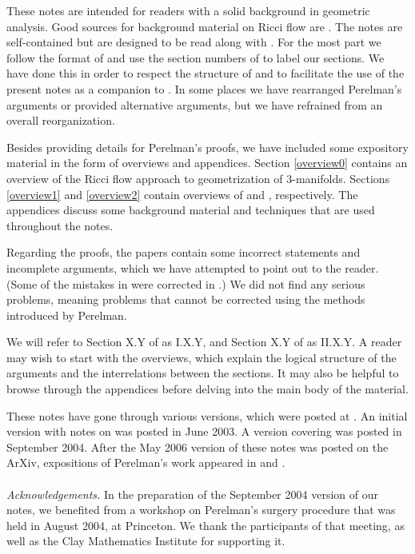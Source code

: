 \documentclass[12pt]{amsart}
\numberwithin{equation}{section}
\theoremstyle{plain}
\theoremstyle{definition}
\theoremstyle{remark}
\begin{document}
These notes are intended for readers with a solid background in geometric analysis.
Good sources for background material on Ricci flow are 
\cite{Chow-Knopf,Chow-Lu-Ni,Hamilton,Topping}.
The notes are self-contained but are designed to be read along with
\cite{Perelman,Perelman2}.
For the most part we follow the format of 
\cite{Perelman,Perelman2} and use the section numbers
of \cite{Perelman,Perelman2} to label our
sections. We have done this in order to respect the
structure of \cite{Perelman,Perelman2} and to facilitate the use of
the present notes as a companion to \cite{Perelman,Perelman2}.
 In some places we have rearranged Perelman's arguments
or provided alternative arguments,
but we have refrained from an overall reorganization.  

Besides providing details for Perelman's proofs, we have included some 
expository material in the form of overviews and appendices.
Section \ref{overview0} contains an overview of the Ricci flow approach to
geometrization of $3$-manifolds. Sections \ref{overview1} and \ref{overview2} contain
overviews of \cite{Perelman} and \cite{Perelman2}, respectively.
The appendices discuss some background material and
techniques that are used throughout the notes.

Regarding the proofs, the papers \cite{Perelman,Perelman2}  contain some incorrect statements 
and incomplete arguments, which we have attempted to point out to the reader.
(Some of the mistakes in \cite{Perelman} were corrected in \cite{Perelman2}.)
We did not find any
serious problems, meaning problems that cannot be corrected using the methods
introduced by Perelman.

We will refer to Section X.Y of \cite{Perelman} as I.X.Y, and
Section X.Y of \cite{Perelman2} as II.X.Y.
A reader may wish to start with the overviews, which 
explain the logical structure of the arguments and the
interrelations between the sections.
It may also be helpful to browse through the appendices before delving into the 
main body of the material.  


These notes have gone through various versions, which were
posted at \cite{KleinerLottwebsite}.
An initial version with notes on \cite{Perelman}
was posted in June 2003.
A version covering \cite{Perelman,Perelman2} was posted in September
2004. 
After the May 2006 version of these notes
 was  posted on the ArXiv, expositions of Perelman's
work appeared in
\cite{Cao-Zhu} and \cite{Morgan-Tian}.
 \\ \\
\noindent
{\em Acknowledgements.}
In the preparation of the September 2004 version of our notes,
we benefited from a 
workshop on Perelman's surgery procedure
that was held in August 2004, at Princeton.
We thank the participants of that meeting, as well as 
the Clay Mathematics Institute for supporting it.
\end{document}
